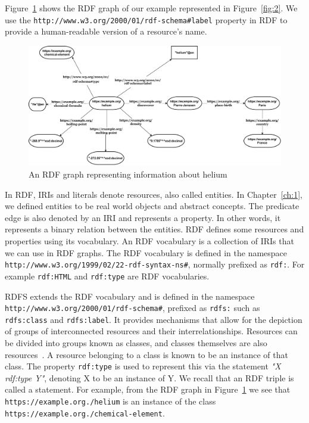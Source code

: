 Figure~\ref{fig:4} shows the RDF graph of our example represented in Figure~\ref{fig:2}. We use the \texttt{http://www.w3.org/2000/01/rdf-schema\#label} property in RDF to provide a human-readable version of a resource's name.

\begin{figure}[h]
  \centering
  \includegraphics[width=0.75 \linewidth]{images/rdf_graph_updated.drawio.pdf}
  \caption{An RDF graph representing information about helium}
  \label{fig:4}
\end{figure}

In RDF, IRIs and literals denote resources, also called entities. In Chapter~\ref{ch:1}, we defined entities to be real world objects and abstract concepts. The predicate edge is also denoted by an IRI and represents a property. In other words, it represents a binary relation between the entities. RDF defines some resources and properties using its vocabulary. An RDF vocabulary is a collection of IRIs that we can use in RDF graphs. The RDF vocabulary is defined in the namespace \texttt{http://www.w3.org/1999/02/22-rdf-syntax-ns\#}, normally prefixed as \texttt{rdf:}. For example \texttt{rdf:HTML} and \texttt{rdf:type} are RDF vocabularies.

RDFS extends the RDF vocabulary and is defined in the namespace \texttt{http://www.w3.org/2000/01/rdf-schema\#}, prefixed as \texttt{rdfs:} such as \texttt{rdfs:class} and \texttt{rdfs:label}. It provides mechanisms that allow for the depiction of groups of interconnected resources and their interrelationships. Resources can be divided into groups known as classes, and classes themselves are also resources~\cite{Brickley2014}. A resource belonging to a class is known to be an instance of that class. The property \texttt{rdf:type} is used to represent this via the statement \textit{"X rdf:type Y"}, denoting X to be an instance of Y. We recall that an RDF triple is called a statement. For example, from the RDF graph in Figure~\ref{fig:4} we see that \texttt{https://example.org./helium} is an instance of the class \texttt{https://example.org./chemical-element}. 


